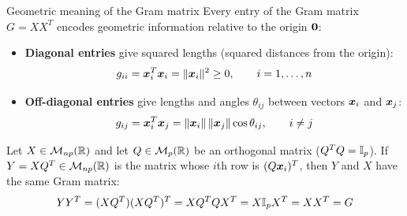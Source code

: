 \documentclass[aspectratio=169]{beamer}\usepackage[]{graphicx}\usepackage[]{xcolor}
\begin{document}
\begin{frame}{Geometric meaning of the Gram matrix}
Every entry of the Gram matrix $G = XX^T$ encodes geometric information relative to the origin $\b0$:
\vfill
\begin{itemize}
\item \textbf{Diagonal entries} give squared lengths (squared distances from the origin):
\[
g_{ii} = \bm{x}_i^T \bm{x}_i = \|\bm{x}_i\|^2 \ge 0, \qquad i=1,\ldots,n
\]
\vfill
\item \textbf{Off-diagonal entries} give lengths and angles $\theta_{ij}$ between vectors $\bm{x}_i$ and $\bm{x}_j$:
\[
g_{ij} = \bm{x}_i^T \bm{x}_j = \|\bm{x}_i\|\,\|\bm{x}_j\|\cos\theta_{ij}, \qquad i\neq j
\]
\end{itemize}
\vfill
\begin{theorem}
\label{th:gram_orthogonal_invariance}
Let $X\in\mathcal{M}_{np}(\mathbb{R})$ and let $Q\in\mathcal{M}_p(\mathbb{R})$ be an orthogonal matrix ($Q^TQ = \mathbb{I}_p$). If $Y = XQ^T\in\mathcal{M}_{np}(\mathbb{R})$ is the matrix whose $i$th row is $(Q\bm{x}_i)^T$, then $Y$ and $X$ have the same Gram matrix:
\[
YY^T = (XQ^T)(XQ^T)^T = X Q^T Q X^T = X \mathbb{I}_p X^T = XX^T = G
\]
\end{theorem}
\end{frame}
\end{document}
